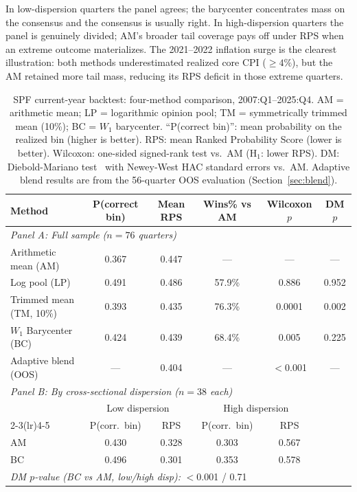 In low-dispersion quarters the panel agrees; the barycenter concentrates mass on the consensus and the consensus is usually right.  In high-dispersion quarters the panel is genuinely divided; AM's broader tail coverage pays off under RPS when an extreme outcome materializes.  The 2021--2022 inflation surge is the clearest illustration: both methods underestimated realized core CPI ($\geq 4\%$), but the AM retained more tail mass, reducing its RPS deficit in those extreme quarters.

\begin{table}[ht]
\centering
\caption{SPF current-year backtest: four-method comparison, 2007:Q1--2025:Q4.  AM = arithmetic mean; LP = logarithmic opinion pool; TM = symmetrically trimmed mean (10\%); BC = $W_1$ barycenter.  ``P(correct bin)'': mean probability on the realized bin (higher is better).  RPS: mean Ranked Probability Score (lower is better).  Wilcoxon: one-sided signed-rank test vs.\ AM (H$_1$: lower RPS).  DM: Diebold-Mariano test~\cite{diebold95} with Newey-West HAC standard errors vs.\ AM.  Adaptive blend results are from the 56-quarter OOS evaluation (Section~\ref{sec:blend}).}
\label{tab:backtest}
\smallskip
\begin{tabular}{lccccc}
\hline
Method & P(correct bin) & Mean RPS & Wins\% vs AM & Wilcoxon $p$ & DM $p$ \\
\hline
\multicolumn{6}{l}{\textit{Panel A: Full sample ($n = 76$ quarters)}} \\[2pt]
Arithmetic mean (AM)         & 0.367 & 0.447 & ---    & ---    & ---    \\
Log pool (LP)                & 0.491 & 0.486 & 57.9\% & 0.886  & 0.952  \\
Trimmed mean (TM, 10\%)      & 0.393 & 0.435 & 76.3\% & 0.0001 & 0.002  \\
$W_1$ Barycenter (BC)        & 0.424 & 0.439 & 68.4\% & 0.005  & 0.225  \\
Adaptive blend (OOS)         & ---   & 0.404 & ---    & $<$0.001 & ---  \\[4pt]
\multicolumn{6}{l}{\textit{Panel B: By cross-sectional dispersion ($n = 38$ each)}} \\[2pt]
 & \multicolumn{2}{c}{Low dispersion} & \multicolumn{2}{c}{High dispersion} & \\
\cmidrule(lr){2-3}\cmidrule(lr){4-5}
 & P(corr.\ bin) & RPS & P(corr.\ bin) & RPS & \\
\hline
AM  & 0.430 & 0.328 & 0.303 & 0.567 & \\
BC  & 0.496 & 0.301 & 0.353 & 0.578 & \\
\hline
\multicolumn{6}{l}{\textit{DM $p$-value (BC vs AM, low/high disp):} $<$0.001 / 0.71} \\
\hline
\end{tabular}
\end{table}

